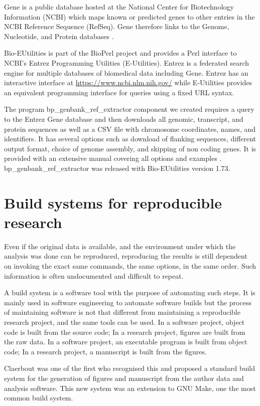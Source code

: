 Gene is a public database hosted at the National Center for
Biotechnology Information (NCBI) which maps known or predicted genes
to other entries in the NCBI Reference Sequence (RefSeq).  Gene therefore
links to the Genome, Nucleotide, and Protein databases \citep{gene-database}.

Bio-EUtilities is part of the BioPerl project and provides a Perl
interface to NCBI's Entrez Programming Utilities (E-Utilities).
Entrez is a federated search engine for multiple databases of
biomedical data including Gene.  Entrez has an
interactive interface at \url{https://www.ncbi.nlm.nih.gov/} while
E-Utilities provides an equivalent
programming interface for queries using a fixed
URL syntax.

The program bp\_genbank\_ref\_extractor component we
created requires a query to the Entrez Gene database and
then downloads all genomic, transcript, and protein sequences as well
as a CSV file with chromosome coordinates, names, and identifiers.  It
has several options such as download of flanking sequences, different
output format, choice of genome assembly, and skipping of non coding
genes.  It is provided with an extensive manual covering all options
and examples .
bp\_genbank\_ref\_extractor was released with
Bio-EUtilities version 1.73.

\section{Build systems for reproducible research}

Even if the original data is available, and the environment under
which the analysis was done can be reproduced, reproducing the results
is still dependent on invoking the exact same commands, the same
options, in the same order.  Such information is often undocumented
and difficult to repeat.

A build system is a software tool with the purpose of automating such
steps.  It is mainly used in software engineering to automate software
builds but the process of maintaining software is not that different
from maintaining a reproducible research project, and the same tools
can be used.  In a software project, object code is built from the
source code; In a research project, figures are built from the raw
data.  In a software project, an executable program is built from
object code; In a research project, a manuscript is built from the
figures.

Claerbout \citep{ReDoc-claerbout} was one of the first who recognised
this and proposed a standard build system for the generation of
figures and manuscript from the author data and analysis software.
This new system was an extension to GNU Make, one the most common
build system.


